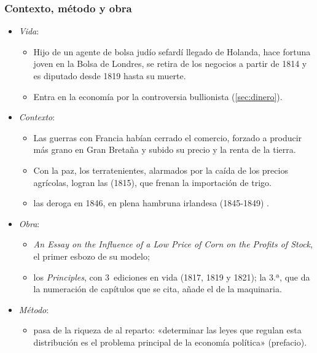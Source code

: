\documentclass[11pt]{article}
\begin{document}
\subsubsection{Contexto, método y obra}\label{sec:ricardo-contexto}

\begin{itemize}
\item \emph{Vida}:
  \begin{itemize}
  \item Hijo de un agente de bolsa judío sefardí llegado de Holanda,  hace fortuna joven en la Bolsa de Londres, se retira de los negocios a partir de 1814 y es diputado desde 1819 hasta su muerte\nocite{HET2026Ricardo}.
  \item Entra en la economía por la controversia bullionista\nocite{Ricardo1810HighPrice} (\ref{sec:dinero}).
  \end{itemize}
\item \emph{Contexto}:
  \begin{itemize}
  \item Las guerras con Francia habían cerrado el comercio, forzado a producir más grano en Gran Bretaña y subido su precio y la renta de la tierra.
  \item Con la paz, los terratenientes, alarmados por la caída de los precios agrícolas, logran las  (1815), que frenan la importación de trigo.
  \item {} las deroga en 1846, en plena hambruna irlandesa (1845-1849)\nocite{GovUK2026Peel} .
  \end{itemize}
\item \emph{Obra}:
  \begin{itemize}
  \item \emph{An Essay on the Influence of a Low Price of Corn on the Profits of Stock}\nocite{Ricardo1815Essay}, el primer esbozo de su modelo;
  \item los \emph{Principles}\nocite{Ricardo1817Principles}, con 3~ediciones en vida (1817, 1819 y 1821); la 3.ª\nocite{Ricardo1821Principles}, que da la numeración de capítulos que se cita, añade el de la maquinaria.
  \end{itemize}
\item \emph{Método}:
  \begin{itemize}
  \item {} pasa de la riqueza de  al reparto: «determinar las leyes que regulan esta distribución es el problema principal de la economía política» (prefacio).

\end{itemize}
\end{itemize}
\end{document}
